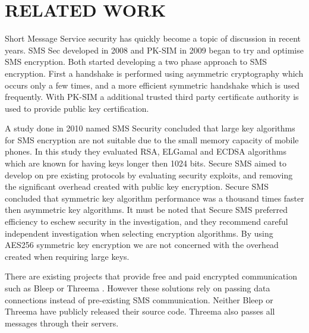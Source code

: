 \section{RELATED WORK}
Short Message Service security has quickly become a topic of discussion in recent years.
SMS Sec \cite{SMSSec} developed in 2008 and PK-SIM \cite{PkSim} in 2009 began to try and optimise SMS encryption.
Both started developing a two phase approach to SMS encryption.
First a handshake is performed using asymmetric cryptography which occurs only a few times, and a more efficient symmetric handshake which is used frequently.
With PK-SIM \cite{PkSim} a additional trusted third party certificate authority is used to provide public key certification.

A study done in 2010 named SMS Security \cite{SmsSecurity} concluded that large key algorithms for SMS encryption are not suitable due to the small memory capacity of mobile phones.
In this study they evaluated RSA, ELGamal and ECDSA algorithms which are known for having keys longer then 1024 bits.
Secure SMS \cite{SecureSms} aimed to develop on pre existing protocols by evaluating security exploits, and removing the significant overhead created with public key encryption.
Secure SMS concluded that symmetric key algorithm performance was a thousand times faster then asymmetric key algorithms.
It must be noted that Secure SMS preferred efficiency to eschew security in the investigation, and they recommend careful independent investigation when selecting encryption algorithms.
By using AES256 symmetric key encryption we are not concerned with the overhead created when requiring large keys.

There are existing projects that provide free and paid encrypted communication such as Bleep \cite{bleep} or Threema \cite{threema}.
However these solutions rely on passing data connections instead of pre-existing SMS communication.
Neither Bleep or Threema have publicly released their source code.
Threema also passes all messages through their servers.


